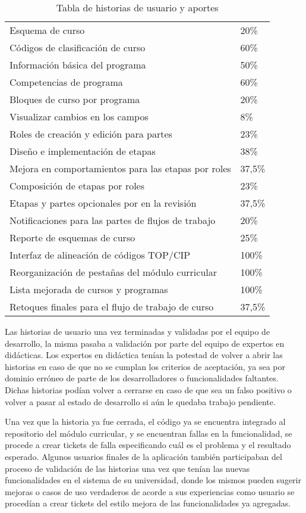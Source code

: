 \begin{table}[H]
\begin{tabular}{@{}ll@{}}
Esquema de curso                                    &  20\%  \\
Códigos de clasificación de curso                   &  60\%  \\
Información básica del programa                     &  50\%  \\
Competencias de programa                            &  60\%  \\
Bloques de curso por programa                       &  20\%  \\
Visualizar cambios en los campos                    &   8\%  \\
Roles de creación y edición para partes             &  23\%  \\
Diseño e implementación de etapas                   &  38\%  \\
Mejora en comportamientos para las etapas por roles & 37,5\% \\
Composición de etapas por roles                     &  23\%  \\
Etapas y partes opcionales por en la revisión       & 37,5\% \\
Notificaciones para las partes de flujos de trabajo &  20\%  \\
Reporte de esquemas de curso                        &  25\%  \\
Interfaz de alineación de códigos TOP/CIP           & 100\%  \\
Reorganización de pestañas del módulo curricular    & 100\%  \\
Lista mejorada de cursos y programas                & 100\%  \\
Retoques finales para el flujo de trabajo de curso  & 37,5\% \\ \bottomrule
\end{tabular}
\caption{Tabla de historias de usuario y aportes}
\label{mis-aportes}
\end{table}

Las historias de usuario una vez terminadas y validadas por el equipo de desarrollo, la misma pasaba a validación por parte del equipo de expertos en didácticas. Los expertos en didáctica tenían la potestad de volver a abrir las historias en caso de que no se cumplan los criterios de aceptación, ya sea por dominio erróneo de parte de los desarrolladores o funcionalidades faltantes. Dichas historias podían volver a cerrarse en caso de que sea un falso positivo o volver a pasar al estado de desarrollo si aún le quedaba trabajo pendiente.

Una vez que la historia ya fue cerrada, el código ya se encuentra integrado al repositorio del módulo curricular, y se encuentran fallas en la funcionalidad, se procede a crear tickets de falla especificando cuál es el problema y el resultado esperado. Algunos usuarios finales de la aplicación también participaban del proceso de validación de las historias una vez que tenían las nuevas funcionalidades en el sistema de su universidad, donde los mismos pueden sugerir mejoras o casos de uso verdaderos de acorde a sus experiencias como usuario se procedían a crear tickets del estilo mejora de las funcionalidades ya agregadas.

